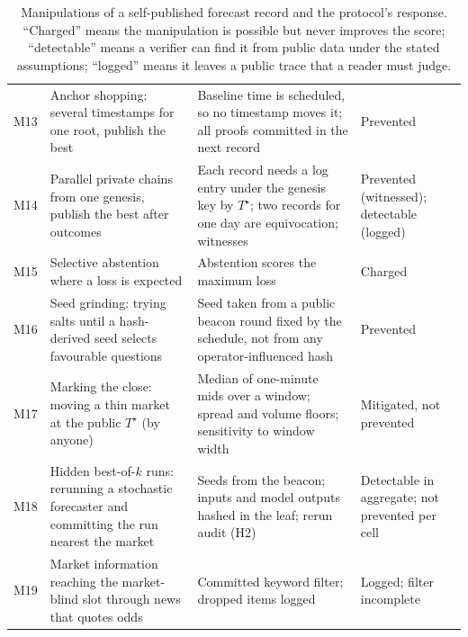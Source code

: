 \documentclass[11pt]{article}
\newcommand{\Ts}{T^{\star}}
\begin{document}
\begin{table}[t]
\begin{tabularx}{\textwidth}{@{}l>{\raggedright\arraybackslash}X>{\raggedright\arraybackslash}X>{\raggedright\arraybackslash}p{2.4cm}@{}}
M13 & Anchor shopping: several timestamps for one root, publish the best & Baseline time is scheduled, so no timestamp moves it; all proofs committed in the next record & Prevented \\
M14 & Parallel private chains from one genesis, publish the best after outcomes & Each record needs a log entry under the genesis key by $\Ts$; two records for one day are equivocation; witnesses & Prevented (witnessed); detectable (logged) \\
M15 & Selective abstention where a loss is expected & Abstention scores the maximum loss & Charged \\
M16 & Seed grinding: trying salts until a hash-derived seed selects favourable questions & Seed taken from a public beacon round fixed by the schedule, not from any operator-influenced hash & Prevented \\
M17 & Marking the close: moving a thin market at the public $\Ts$ (by anyone) & Median of one-minute mids over a window; spread and volume floors; sensitivity to window width & Mitigated, not prevented \\
M18 & Hidden best-of-$k$ runs: rerunning a stochastic forecaster and committing the run nearest the market & Seeds from the beacon; inputs and model outputs hashed in the leaf; rerun audit (H2) & Detectable in aggregate; not prevented per cell \\
M19 & Market information reaching the market-blind slot through news that quotes odds & Committed keyword filter; dropped items logged & Logged; filter incomplete \\
\bottomrule
\end{tabularx}
\caption{Manipulations of a self-published forecast record and the protocol's response. ``Charged'' means the manipulation is possible but never improves the score; ``detectable'' means a verifier can find it from public data under the stated assumptions; ``logged'' means it leaves a public trace that a reader must judge.}
\label{tab:threats}
\end{table}
\end{document}
